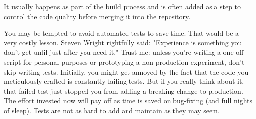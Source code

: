 It usually happens as part of the build process and is often added as a step to control the code quality before merging it into the repository.

You may be tempted to avoid automated tests to save time. That would be a very costly lesson. Steven Wright rightfully said: "Experience is something you don't get until just after you need it." Trust me: unless you're writing a one-off script for personal purposes or prototyping a non-production experiment, don't skip writing tests. Initially, you might get annoyed by the fact that the code you meticulously crafted is constantly failing tests. But if you really think about it, that failed test just stopped you from adding a breaking change to production. The effort invested now will pay off as time is saved on bug-fixing (and full nights of sleep). Tests are not as hard to add and maintain as they may seem.





























